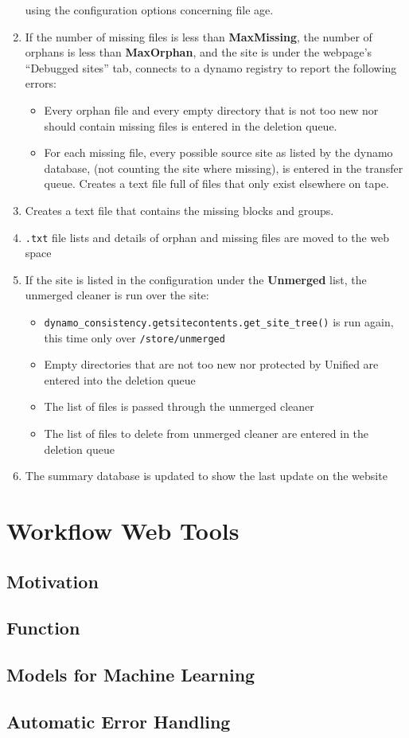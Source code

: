 \begin{enumerate}
  using the configuration options concerning file age.
\item If the number of missing files is less than {\bf MaxMissing},
  the number of orphans is less than {\bf MaxOrphan},
  and the site is under the webpage’s “Debugged sites” tab,
  connects to a dynamo registry to report the following errors:
  \begin{itemize}
  \item Every orphan file and every empty directory that is not too new
    nor should contain missing files is entered in the deletion queue.
  \item For each missing file, every possible source site as listed by the dynamo database,
    (not counting the site where missing), is entered in the transfer queue.
    Creates a text file full of files that only exist elsewhere on tape.
  \end{itemize}
\item Creates a text file that contains the missing blocks and groups.
\item \texttt{.txt} file lists and details of orphan and missing files are moved
  to the web space
\item If the site is listed in the configuration under the {\bf Unmerged} list,
  the unmerged cleaner is run over the site:
  \begin{itemize}
  \item \texttt{dynamo\_consistency.getsitecontents.get\_site\_tree()} is run again,
    this time only over \texttt{/store/unmerged}
  \item Empty directories that are not too new nor protected by Unified
    are entered into the deletion queue
  \item The list of files is passed through the unmerged cleaner
  \item The list of files to delete from unmerged cleaner
    are entered in the deletion queue
  \end{itemize}
\item The summary database is updated to show the last update on the website
\end{enumerate}

\section{Workflow Web Tools}


\subsection{Motivation}


\subsection{Function}


\subsection{Models for Machine Learning}


\subsection{Automatic Error Handling}

